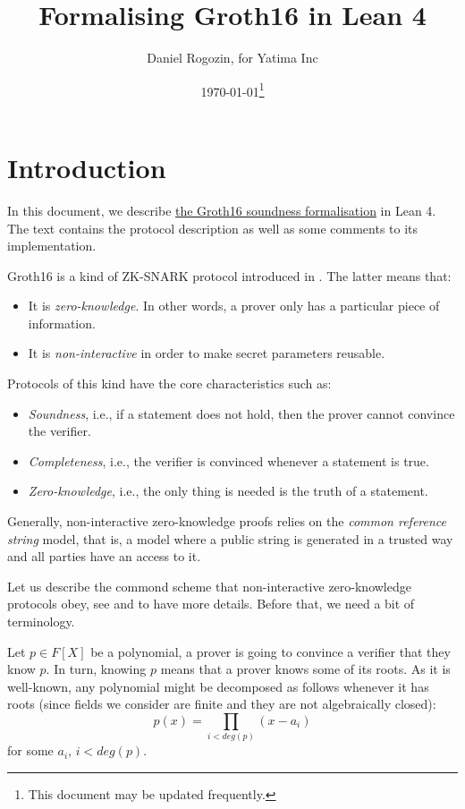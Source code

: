 \documentclass{article}
\title{Formalising Groth16 in Lean 4}
\author{Daniel Rogozin, for Yatima Inc}
\date{\today\footnote{This document may be updated frequently.}}
\theoremstyle{definition}
\theoremstyle{remark}
\begin{document}
\maketitle

\section{Introduction}

In this document, we describe \href{https://github.com/yatima-inc/ZKSnark.lean/blob/daniel/groth16-protocol/ZkSNARK/Groth16/KnowledgeSoundness.lean}{the Groth16 soundness formalisation} in Lean 4.
The text contains the protocol description as well as some comments to its implementation.

Groth16 is a kind of ZK-SNARK protocol introduced in \cite{groth2016size}. The latter means that:

\begin{itemize}
\item It is \emph{zero-knowledge}. In other words, a prover only has a particular piece of information.
\item It is \emph{non-interactive} in order to make secret parameters reusable.
\end{itemize}

Protocols of this kind have the core characteristics such as:
\begin{itemize}
\item \emph{Soundness}, i.e., if a statement does not hold, then the prover cannot convince the verifier.
\item \emph{Completeness}, i.e., the verifier is convinced whenever a statement is true.
\item \emph{Zero-knowledge}, i.e., the only thing is needed is the truth of a statement.
\end{itemize}

Generally, non-interactive zero-knowledge proofs relies on the \emph{common reference string} model, that is, a model where a public string is generated in a trusted way and all parties have an access to it.

Let us describe the commond scheme that non-interactive zero-knowledge protocols obey, see \cite{petkus2019and} and \cite{bitansky2012extractable} to have more details. Before that, we need a bit of terminology.

Let $p \in F[X]$ be a polynomial, a prover is going to convince a verifier that they know $p$. In turn, knowing $p$ means that a prover knows some of its roots. As it is well-known, any polynomial might be decomposed as follows whenever it has roots (since fields we consider are finite and they are not algebraically closed):
\begin{equation}
p(x) = \prod_{i < deg(p)} (x - a_i)
\end{equation}
for some $a_i$, $i < deg(p)$.
\end{document}

